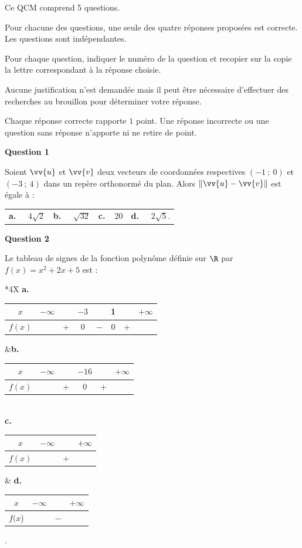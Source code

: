 \medskip
Ce QCM comprend 5 questions.

Pour chacune des questions, une seule des quatre réponses proposées est correcte. Les
questions sont indépendantes.

Pour chaque question, indiquer le numéro de la question et recopier sur la copie la lettre
correspondant à la réponse choisie.

Aucune justification n'est demandée mais il peut être nécessaire d'effectuer des recherches
au brouillon pour déterminer votre réponse.

Chaque réponse correcte rapporte $1$ point. Une réponse incorrecte ou une question sans
réponse n'apporte ni ne retire de point.

\medskip
\textbf{Question 1}
\medskip 


Soient $\vv{u}$ et $\vv{v}$ deux vecteurs de coordonnées respectives $(-1~;~0)$ et $(-3~;~4)$ dans un repère orthonormé du plan. Alors $ \left\|\vv{u}-\vv{v}\right\|$ est égale à :

\medskip

\begin{tabularx}{\linewidth}{*{4}{X}}
\textbf{a.~~} $4\sqrt{2} $ &\textbf{b.~~} $\sqrt{32} $&\textbf{c.~~}$20 $& \textbf{d.~~} $2\sqrt{5}  $.
\end{tabularx}

\medskip
\textbf{Question 2}
\medskip 

Le tableau de signes de la fonction polynôme définie sur $\R$ par $f(x) = x^2 + 2x + 5$ est :

\medskip

\begin{tabularx}{\linewidth}{*{4}{X}}
\textbf{a.~~} \begin{tabular}[]{|c|lcccccr|}
\hline
$x$ &$-\infty$& &$-3$& &1& &$+\infty$\\
\hline
$f(x)$& &+ &0& $-$ &0 &+&\\\hline
\end{tabular} &\textbf{b.~~}
\begin{tabular}[]{|c|lcccr|}\hline
$x$& $-\infty$& &$- 16$& &$+\infty$\\\hline
$f(x)$&        &+& 0  & + & \\\hline
\end{tabular}\\[1.2cm]

\textbf{c.~~}
\begin{tabular}[]{|c|l m{1.2cm}r|}
\hline
 $x$& $-\infty$& &$+\infty$\\\hline
$f(x)$&& \centering +&\\\hline
\end{tabular}
& \textbf{d.~~} 
\begin{tabular}[]{|c|l m{1.2cm}r|}
\hline
 $x$& $-\infty$& &$+\infty$\\\hline
$f(x$)&& \centering $-$&\\\hline
\end{tabular}.
\end{tabularx}

